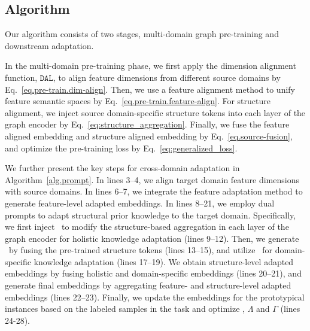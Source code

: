 


\subsection{Algorithm}\label{app.alg}
Our algorithm consists of two stages, multi-domain graph pre-training and downstream adaptation.

In the multi-domain pre-training phase,  we first apply the dimension alignment function, $\mathtt{DAL}$, to align feature dimensions from different source domains by Eq.~\eqref{eq.pre-train.dim-align}. Then, we use a feature alignment method to unify feature semantic spaces by Eq.~\eqref{eq.pre-train.feature-align}. For structure alignment, we inject source domain-specific structure tokens into each layer of the graph encoder by Eq.~\eqref{eq:structure_aggregation}. Finally, we fuse the feature aligned embedding and structure aligned embedding by Eq.~\eqref{eq.source-fusion}, and optimize the pre-training loss by Eq.~\eqref{eq:generalized_loss}.

We further present the key steps for cross-domain adaptation in Algorithm~\ref{alg.prompt}. In lines 3--4, we align target domain feature dimensions with source domains. In lines 6--7, we integrate the feature adaptation method to generate feature-level adapted embeddings. In lines 8--21, we employ dual prompts to adapt structural prior knowledge to the target domain. Specifically, we first inject \op\ to modify the structure-based aggregation in each layer of the graph encoder for holistic knowledge adaptation (lines 9--12). Then, we generate \cp\ by fusing the pre-trained structure tokens (lines 13--15), and utilize \cp\ for domain-specific knowledge adaptation (lines 17--19). We obtain structure-level adapted embeddings by fusing holistic and domain-specific embeddings (lines 20--21), and generate final embeddings by aggregating feature- and structure-level adapted embeddings (lines 22--23). Finally, we update the embeddings for the prototypical instances based on the labeled samples in the task and optimize \op, $\Lambda$ and $\Gamma$ (lines 24-28). %

